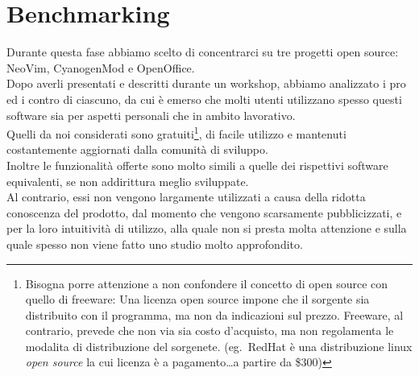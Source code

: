 \documentclass[12pt]{article} %
\begin{document}
\newpage

\section{Benchmarking}
Durante questa fase abbiamo scelto di concentrarci su tre progetti open source: NeoVim, CyanogenMod e OpenOffice.\\
Dopo averli presentati e descritti durante un workshop, abbiamo analizzato i pro ed i contro di ciascuno, da cui \`e emerso che molti utenti utilizzano spesso questi software sia per aspetti personali che in ambito lavorativo.\\
Quelli da noi considerati sono gratuiti\footnote{Bisogna porre attenzione a non confondere il concetto di open source con quello di freeware: Una licenza open source impone che il sorgente sia distribuito con il programma, ma non da indicazioni sul prezzo. Freeware, al contrario, prevede che non via sia costo d'acquisto, ma non regolamenta le modalita di distribuzione del sorgenete. (eg.\ RedHat \`e una distribuzione linux \emph{open source} la cui licenza \`e a pagamento\dots a partire da \$300)}, di facile utilizzo e mantenuti costantemente aggiornati dalla comunit\`a di sviluppo.\\
Inoltre le funzionalit\`a offerte sono molto simili a quelle dei rispettivi software equivalenti, se non addirittura meglio sviluppate.\\
Al contrario, essi non vengono largamente utilizzati a causa della ridotta conoscenza del prodotto, dal momento che vengono scarsamente pubblicizzati, e per la loro intuitivit\`a di utilizzo, alla quale non si presta molta attenzione e sulla quale spesso non viene fatto uno studio molto approfondito.\\
\end{document}
